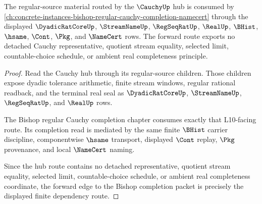 \begin{theorem}
\label{thm:cauchy-orphan-bishop-completion-route}
The regular-source material routed by the $\CauchyUp$ hub is consumed by \autoref{ch:concrete-instances-bishop-regular-cauchy-completion-namecert} through the displayed $\DyadicRatCoreUp$, $\StreamNameUp$, $\RegSeqRatUp$, $\RealUp$, $\BHist$, $\hsame$, $\Cont$, $\Pkg$, and $\NameCert$ rows. The forward route exports no detached Cauchy representative, quotient stream equality, selected limit, countable-choice schedule, or ambient real completeness principle.
\end{theorem}
\begin{proof}
Read the Cauchy hub through its regular-source children. Those children expose dyadic tolerance arithmetic, finite stream windows, regular rational readback, and the terminal real seal as $\DyadicRatCoreUp$, $\StreamNameUp$, $\RegSeqRatUp$, and $\RealUp$ rows.

The Bishop regular Cauchy completion chapter consumes exactly that L10-facing route. Its completion read is mediated by the same finite $\BHist$ carrier discipline, componentwise $\hsame$ transport, displayed $\Cont$ replay, $\Pkg$ provenance, and local $\NameCert$ naming.

Since the hub route contains no detached representative, quotient stream equality, selected limit, countable-choice schedule, or ambient real completeness coordinate, the forward edge to the Bishop completion packet is precisely the displayed finite dependency route.
\end{proof}
